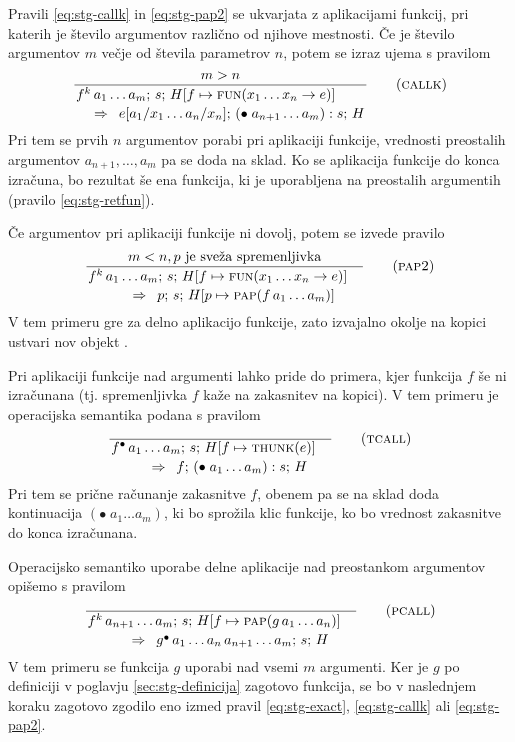 Pravili \ref{eq:stg-callk} in \ref{eq:stg-pap2} se ukvarjata z aplikacijami funkcij, pri katerih je število argumentov različno od njihove mestnosti. Če je število argumentov $m$ večje od števila parametrov $n$, potem se izraz ujema s pravilom
\begin{equation}
	\linfer[callk]{
		m > n
	}{
		f^k \, a_1 \dots a_m ; \, s; \, H[f \mapsto \textsc{fun}(x_1 \dots x_n \to e)]
	}{
		e[a_1 / x_1 \dots a_n / x_n]; \, (\bullet \; a_{n + 1} \dots a_m) : s; \, H
	}
\label{eq:stg-callk}
\end{equation}
Pri tem se prvih $n$ argumentov porabi pri aplikaciji funkcije, vrednosti preostalih argumentov $a_{n + 1}, \dots, a_m$ pa se doda na sklad. Ko se aplikacija funkcije do konca izračuna, bo rezultat še ena funkcija, ki je uporabljena na preostalih argumentih (pravilo \ref{eq:stg-retfun}).

Če argumentov pri aplikaciji funkcije ni dovolj, potem se izvede pravilo
\begin{equation}
	\linfer[pap2]{
		m < n, \text{$p$ je sveža spremenljivka}
	}{
		f^k \, a_1 \dots a_m ; \, s; \, H[f \mapsto \textsc{fun}(x_1 \dots x_n \to e)]
	}{
		p; \, s; \, H[p \mapsto \textsc{pap}(f \, a_1 \dots a_m)]
	}
\label{eq:stg-pap2}
\end{equation}
V tem primeru gre za delno aplikacijo funkcije, zato izvajalno okolje na kopici ustvari nov objekt .

Pri aplikaciji funkcije nad argumenti lahko pride do primera, kjer funkcija $f$ še ni izračunana (tj. spremenljivka $f$ kaže na zakasnitev na kopici). V tem primeru je operacijska semantika podana s pravilom
\begin{equation}
	\linfer[tcall]{}{
		f^\bullet \, a_1 \dots a_m ; \, s; \, H[f \mapsto \textsc{thunk}(e)]
	}{
		f; \, (\bullet \; a_1 \dots a_m) : s; \, H
	}
\label{eq:stg-tcall}
\end{equation}
Pri tem se prične računanje zakasnitve $f$, obenem pa se na sklad doda kontinuacija $(\bullet \; a_1 \dots a_m)$, ki bo sprožila klic funkcije, ko bo vrednost zakasnitve do konca izračunana.

Operacijsko semantiko uporabe delne aplikacije nad preostankom argumentov opišemo s pravilom
\begin{equation}
	\linfer[pcall]{}{
		f^k \, a_{n + 1} \dots a_m ; \, s; \, H[f \mapsto \textsc{pap}(g \, a_1 \dots a_n)]
	}{
		g^\bullet \, a_1 \dots a_n \, a_{n + 1} \dots a_m; \, s; \, H
	}
\label{eq:stg-pcall}
\end{equation}
V tem primeru se funkcija $g$ uporabi nad vsemi $m$ argumenti. Ker je $g$ po definiciji v poglavju \ref{sec:stg-definicija} zagotovo funkcija, se bo v naslednjem koraku zagotovo zgodilo eno izmed pravil \ref{eq:stg-exact}, \ref{eq:stg-callk} ali \ref{eq:stg-pap2}.


